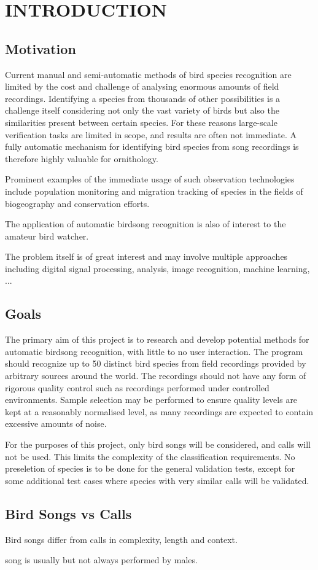 \chapter{INTRODUCTION}

\section{Motivation}
Current manual and semi-automatic methods of bird species recognition are limited
by the cost and challenge of analysing enormous amounts of field recordings.
Identifying a species from thousands of other possibilities is a challenge itself
considering not only the vast variety of birds but also the similarities
present between certain species.
For these reasons large-scale verification tasks are limited in scope, and results
are often not immediate.
A fully automatic mechanism for identifying bird species from song recordings is
therefore highly valuable for ornithology.

Prominent examples of the immediate usage of such observation technologies include
population monitoring and migration tracking of species in the fields of
biogeography and conservation efforts.

The application of automatic birdsong recognition is also of interest to the
amateur bird watcher.

The problem itself is of great interest and may involve multiple approaches
including digital signal processing, analysis, image recognition, machine learning,
...

\section{Goals}
The primary aim of this project is to research and develop potential methods
for automatic birdsong recognition, with little to no user interaction.
The program should recognize up to 50 distinct bird species from field recordings
provided by arbitrary sources around the world.
The recordings should not have any form of rigorous quality control such as
recordings performed under controlled environments.
Sample selection may be performed to ensure quality levels are kept at a
reasonably normalised level, as many recordings are expected to contain
excessive amounts of noise.

For the purposes of this project, only bird songs will be considered, and calls
will not be used.
This limits the complexity of the classification requirements.
No preseletion of species is to be done for the general validation tests, except
for some additional test cases where species with very similar calls will be
validated.

\section{Bird Songs vs Calls}
Bird songs differ from calls in complexity, length and context.

song is usually but not always performed by males.
